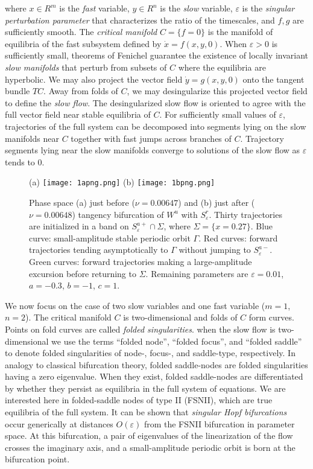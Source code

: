 \documentclass[aip, cha, sd, amsmath,amssymb, preprint]{revtex4-1}
\begin{document}
where $x \in R^m$ is the {\it fast} variable, $y \in R^n$ is the {\it slow} variable, ${ \varepsilon}$ is the {\it singular perturbation parameter} that characterizes the ratio of the timescales,  and $f,g$ are sufficiently smooth. The {\it critical manifold} $C = \{f  = 0\}$ is the manifold of equilibria of the fast subsystem defined by $\dot{x} = f(x,y,0)$. When ${ \varepsilon} > 0$ is sufficiently small, theorems of Fenichel\cite{fenichel1972} guarantee the existence of locally invariant {\it slow manifolds} that perturb from subsets of $C$ where the equilibria are hyperbolic. We may also project the vector field $\dot{y} = g(x,y,0)$  onto the tangent bundle $TC$. Away from folds of $C$, we may desingularize this projected vector field to define the {\it slow flow}. The desingularized slow flow is oriented to agree with the full vector field near stable equilibria of $C$. For sufficiently small values of ${ \varepsilon}$, trajectories of the full system can be decomposed into segments lying on the slow manifolds near $C$ together with fast jumps across branches of $C$. Trajectory segments lying near the slow manifolds converge to solutions of the slow flow as ${ \varepsilon}$ tends to 0. 

\begin{figure*}
(a) \texttt{[image: 1apng.png]}
(b) \texttt{[image: 1bpng.png]}
\caption{\label{fig:tangbif} Phase space (a) just before ($\nu = 0.00647$) and (b) just after ($\nu = 0.00648$) tangency bifurcation of $W^u$ with $S^r_{ \varepsilon}$. Thirty trajectories are initialized in a band on $S^{a+}_{ \varepsilon}\cap \Sigma$, where $\Sigma = \{x = 0.27\}$. Blue curve: small-amplitude stable periodic orbit $\Gamma$. Red curves: forward trajectories tending asymptotically to $\Gamma$ without jumping to $S^{a-}_{ \varepsilon}$. Green curves: forward trajectories making a large-amplitude excursion before returning to $\Sigma$. Remaining parameters are ${ \varepsilon} = 0.01$, $a = -0.3$, $b = -1$, $c = 1$.}
\end{figure*}

We now focus on the case of two slow variables and one fast variable ($m=1$, $n=2$). The critical manifold $C$ is two-dimensional and folds of $C$ form curves. Points on fold curves are called {\it folded singularities}. when the slow flow is two-dimensional we use the terms ``folded node'', ``folded focus'', and ``folded saddle'' to denote folded singularities of node-, focus-, and saddle-type, respectively.  In analogy to classical bifurcation theory, folded saddle-nodes are folded singularities having a zero eigenvalue. When they exist, folded saddle-nodes are differentiated by whether they persist as equilibria in the full system of equations. We are interested here in folded-saddle nodes of type II (FSNII), which are true equilibria of the full system. It can be shown that {\it singular Hopf bifurcations} occur generically at distances $O({ \varepsilon})$ from the FSNII bifurcation in parameter space.\cite{guckenheimer2008siam} At this bifurcation, a pair of eigenvalues of the linearization of the flow crosses the imaginary axis, and a small-amplitude periodic orbit is born at the bifurcation point.
\end{document}
